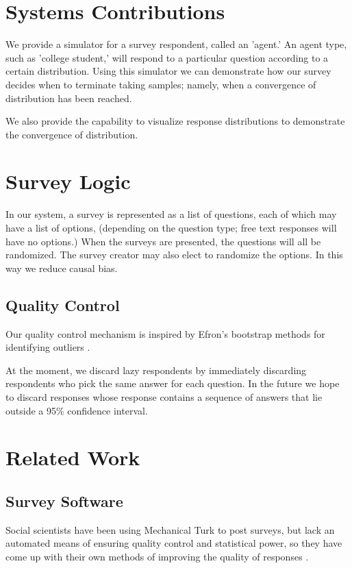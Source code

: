 \documentclass{article}
\begin{document}
\section{Systems Contributions}
We provide a simulator for a survey respondent, called an 'agent.' An agent type, such as 'college student,' will respond to a particular question according to a certain distribution. Using this simulator we can demonstrate how our survey decides when to terminate taking samples; namely, when a convergence of distribution has been reached. %

We also provide the capability to visualize response distributions to demonstrate the convergence of distribution.

\section{Survey Logic}
In our system, a survey is represented as a list of questions, each of which may have a list of options, (depending on the question type; free text responses will have no options.) When the surveys are presented, the questions will all be randomized. The survey creator may also elect to randomize the options. In this way we reduce causal bias.
	

\subsection{Quality Control}
Our quality control mechanism is inspired by Efron's bootstrap methods for identifying outliers \cite{bootstrap}.

At the moment, we discard lazy respondents by immediately discarding respondents who pick the same answer for each question. In the future we hope to discard responses whose response contains a sequence of answers that lie outside a 95\% confidence interval. %
\section{Related Work}
\subsection{Survey Software}
Social scientists have been using Mechanical Turk to post surveys, but lack an automated means of ensuring quality control and statistical power, so they have come up with their own methods of improving the quality of responses \cite{mturk_guide}.
\end{document}
